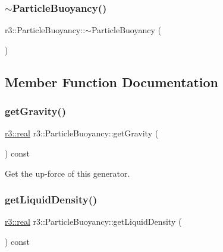 \subsubsection{\texorpdfstring{$\sim$\+Particle\+Buoyancy()}{~ParticleBuoyancy()}}
{\footnotesize\ttfamily r3\+::\+Particle\+Buoyancy\+::$\sim$\+Particle\+Buoyancy (\begin{DoxyParamCaption}{ }\end{DoxyParamCaption})\hspace{0.3cm}{\ttfamily [default]}}



\subsection{Member Function Documentation}
\mbox{\label{classr3_1_1_particle_buoyancy_a10eb48db4677b687b49e2478fed25919}} 
\subsubsection{\texorpdfstring{get\+Gravity()}{getGravity()}}
{\footnotesize\ttfamily \mbox{\hyperlink{namespacer3_ab2016b3e3f743fb735afce242f0dc1eb}{r3\+::real}} r3\+::\+Particle\+Buoyancy\+::get\+Gravity (\begin{DoxyParamCaption}{ }\end{DoxyParamCaption}) const}



Get the up-\/force of this generator. 

\mbox{\label{classr3_1_1_particle_buoyancy_a075809e6cbced13f164cbcdcf50e04fc}} 
\subsubsection{\texorpdfstring{get\+Liquid\+Density()}{getLiquidDensity()}}
{\footnotesize\ttfamily \mbox{\hyperlink{namespacer3_ab2016b3e3f743fb735afce242f0dc1eb}{r3\+::real}} r3\+::\+Particle\+Buoyancy\+::get\+Liquid\+Density (\begin{DoxyParamCaption}{ }\end{DoxyParamCaption}) const}



